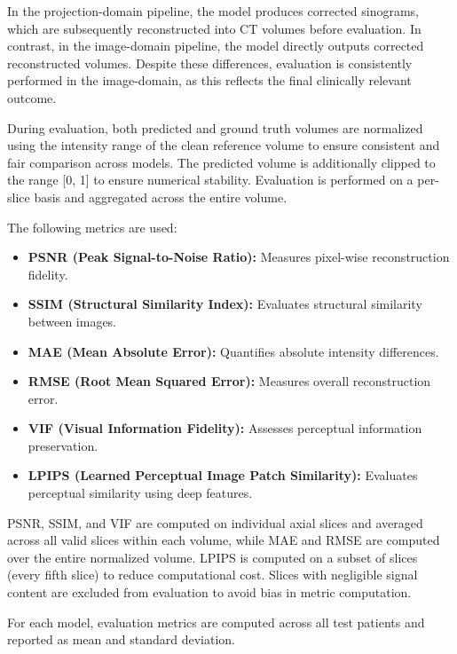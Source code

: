 In the projection-domain pipeline, the model produces corrected sinograms, which are subsequently reconstructed into CT volumes before evaluation. In contrast, in the image-domain pipeline, the model directly outputs corrected reconstructed volumes. Despite these differences, evaluation is consistently performed in the image-domain, as this reflects the final clinically relevant outcome.

During evaluation, both predicted and ground truth volumes are normalized using the intensity range of the clean reference volume to ensure consistent and fair comparison across models. The predicted volume is additionally clipped to the range [0, 1] to ensure numerical stability. Evaluation is performed on a per-slice basis and aggregated across the entire volume.

The following metrics are used:
\begin{itemize}

\item \textbf{PSNR (Peak Signal-to-Noise Ratio):} Measures pixel-wise reconstruction fidelity.

\item \textbf{SSIM (Structural Similarity Index):} Evaluates structural similarity between images.

\item \textbf{MAE (Mean Absolute Error):} Quantifies absolute intensity differences.

\item \textbf{RMSE (Root Mean Squared Error):} Measures overall reconstruction error.

\item \textbf{VIF (Visual Information Fidelity):} Assesses perceptual information preservation.

\item \textbf{LPIPS (Learned Perceptual Image Patch Similarity):} Evaluates perceptual similarity using deep features.

\end{itemize}

PSNR, SSIM, and VIF are computed on individual axial slices and averaged across all valid slices within each volume, while MAE and RMSE are computed over the entire normalized volume. LPIPS is computed on a subset of slices (every fifth slice) to reduce computational cost.  Slices with negligible signal content are excluded from evaluation to avoid bias in metric computation.

For each model, evaluation metrics are computed across all test patients and reported as mean and standard deviation. 








